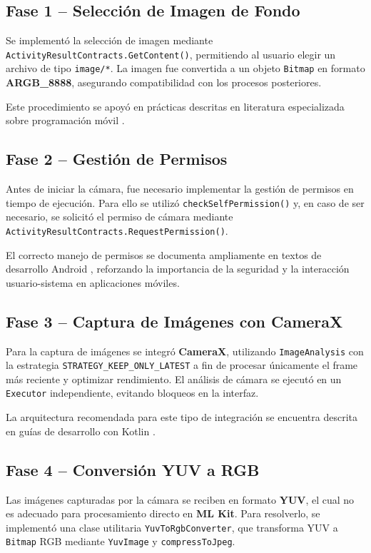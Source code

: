\documentclass[conference]{IEEEtran}
\begin{document}
\subsection{Fase 1 – Selección de Imagen de Fondo}
Se implementó la selección de imagen mediante \texttt{ActivityResultContracts.GetContent()}, permitiendo al usuario elegir un archivo de tipo \texttt{image/*}. La imagen fue convertida a un objeto \texttt{Bitmap} en formato \textbf{ARGB\_8888}, asegurando compatibilidad con los procesos posteriores.  

Este procedimiento se apoyó en prácticas descritas en literatura especializada sobre programación móvil \cite{bignerdandroid}.  

\subsection{Fase 2 – Gestión de Permisos}
Antes de iniciar la cámara, fue necesario implementar la gestión de permisos en tiempo de ejecución. Para ello se utilizó \texttt{checkSelfPermission()} y, en caso de ser necesario, se solicitó el permiso de cámara mediante \texttt{ActivityResultContracts.RequestPermission()}.  

El correcto manejo de permisos se documenta ampliamente en textos de desarrollo Android \cite{bignerdandroid}, reforzando la importancia de la seguridad y la interacción usuario-sistema en aplicaciones móviles.  

\subsection{Fase 3 – Captura de Imágenes con CameraX}
Para la captura de imágenes se integró \textbf{CameraX}, utilizando \texttt{ImageAnalysis} con la estrategia \texttt{STRATEGY\_KEEP\_ONLY\_LATEST} a fin de procesar únicamente el frame más reciente y optimizar rendimiento. El análisis de cámara se ejecutó en un \texttt{Executor} independiente, evitando bloqueos en la interfaz.  

La arquitectura recomendada para este tipo de integración se encuentra descrita en guías de desarrollo con Kotlin \cite{bignerdkotlin}.  

\subsection{Fase 4 – Conversión YUV a RGB}
Las imágenes capturadas por la cámara se reciben en formato \textbf{YUV}, el cual no es adecuado para procesamiento directo en \textbf{ML Kit}. Para resolverlo, se implementó una clase utilitaria \texttt{YuvToRgbConverter}, que transforma YUV a \texttt{Bitmap} RGB mediante \texttt{YuvImage} y \texttt{compressToJpeg}.  
\end{document}
